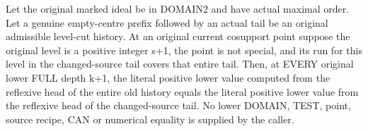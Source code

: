\begin{theorem}
\label{hir:original-positive-empty-prefix-base-values}
\leanok
Let the original marked ideal be in DOMAIN2 and have actual maximal order.
Let a genuine empty-centre prefix followed by an actual tail be an
original admissible level-cut history. At an original current cosupport
point suppose the original level is a positive integer s+1, the point is
not special, and its run for this level in the changed-source tail covers
that entire tail. Then, at EVERY original lower FULL depth k+1, the literal
positive lower value computed from the reflexive head of the entire old
history equals the literal positive lower value from the reflexive head
of the changed-source tail. No lower DOMAIN, TEST, point, source recipe,
CAN or numerical equality is supplied by the caller.
\end{theorem}
